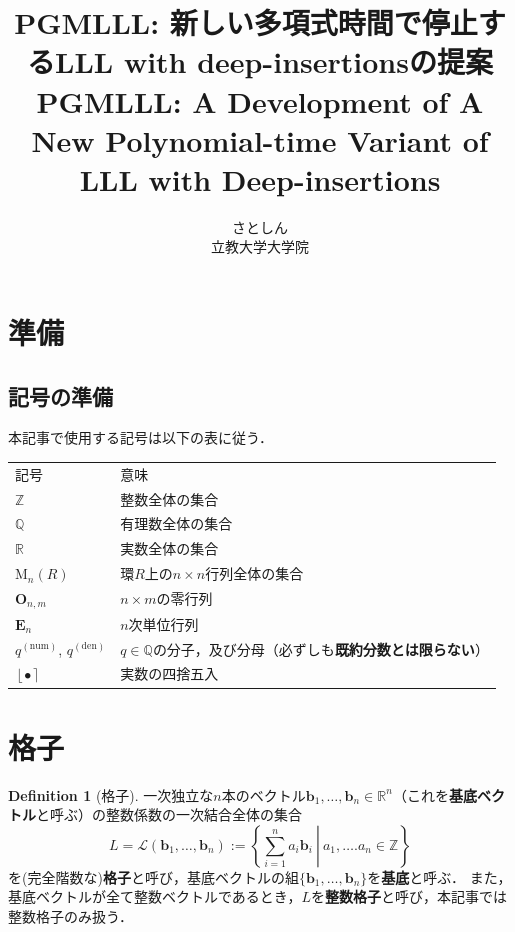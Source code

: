 \documentclass[a4j, dvipdfmx]{jsarticle}
\title{
    PGMLLL: 新しい多項式時間で停止するLLL with deep-insertionsの提案
    \\
    PGMLLL: A Development of A New Polynomial-time Variant of LLL with Deep-insertions
}
\author{
    さとしん
    \\
    立教大学大学院
}
\theoremstyle{definition}
\newtheorem{definition}{Definition}[section]
\newcommand{\round}[1]{\left\lfloor #1\right\rceil}
\newcommand{\bhline}{\noalign{\hrule height 1.0pt}}
\begin{document}
\maketitle

\section{準備}

\subsection{記号の準備}

本記事で使用する記号は以下の表に従う．

\begin{tabular}{l||l}
    記号 & 意味\\
    \bhline
    $\mathbb{Z}$ & 整数全体の集合\\
    \hline
    $\mathbb{Q}$ & 有理数全体の集合\\
    \hline
    $\mathbb{R}$ & 実数全体の集合\\
    \hline
    $\mathrm{M}_n(R)$ & 環$R$上の$n\times n$行列全体の集合\\
    \hline
    $\boldsymbol{O}_{n, m}$ & $n\times m$の零行列\\
    \hline
    $\boldsymbol{E}_n$ & $n$次単位行列\\
    \hline
    $q^{(\text{num})}$, $q^{(\text{den})}$ & $q\in\mathbb{Q}$の分子，及び分母（必ずしも\textbf{既約分数とは限らない}）\\
    \hline
    $\round{\bullet}$ & 実数の四捨五入
\end{tabular}

\section{格子}

\begin{definition}[格子]
一次独立な$n$本のベクトル$\boldsymbol{b}_1,\ldots,\boldsymbol{b}_n\in\mathbb{R}^n$（これを\textbf{基底ベクトル}と呼ぶ）の整数係数の一次結合全体の集合
\[
L=\mathcal{L}(\boldsymbol{b}_1,\ldots,\boldsymbol{b}_n):=\left\lbrace \left.\sum_{i=1}^na_i\boldsymbol{b}_i~\right|~a_1,\ldots.a_n\in\mathbb{Z}\right\rbrace
\]
を(完全階数な)\textbf{格子}と呼び，基底ベクトルの組$\{\boldsymbol{b}_1,\ldots,\boldsymbol{b}_n\}$を\textbf{基底}と呼ぶ．
また，基底ベクトルが全て整数ベクトルであるとき，$L$を\textbf{整数格子}と呼び，本記事では整数格子のみ扱う．
\end{definition}
\end{document}
